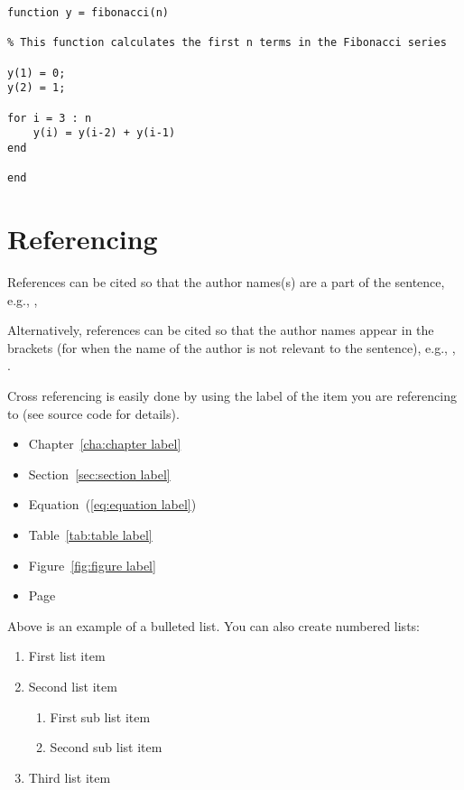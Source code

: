 \begin{lstlisting}[style=matlabcode,
    caption = A MATLAB function to compute the first $n$ numbers of the Fibonacci series,
    label = mat:fibonacci
    ]
function y = fibonacci(n)

% This function calculates the first n terms in the Fibonacci series

y(1) = 0;
y(2) = 1;

for i = 3 : n
    y(i) = y(i-2) + y(i-1)
end

end
\end{lstlisting}

\section{Referencing}
References can be cited so that the author names(s) are a part of the sentence, e.g., \textcite{stroud:2013}, \textcite{harten:1983}

Alternatively, references can be cited so that the author names appear in the brackets (for when the name of the author is not relevant to the sentence), e.g., \parencite{stroud:2013},  \parencite{harten:1983}.

Cross referencing is easily done by using the label of the item you are referencing to (see source code for details).
\begin{itemize}
	\item Chapter~\ref{cha:chapter label}
	\item Section~\ref{sec:section label}
	\item Equation~(\ref{eq:equation label})
	\item Table~\ref{tab:table label}
	\item Figure~\ref{fig:figure label}
	\item Page~\pageref{eq:equation label}
\end{itemize}

Above is an example of a bulleted list. You can also create numbered lists:
\begin{enumerate}
	\item First list item
	\item Second list item
	\begin{enumerate}
		\item First sub list item
		\item Second sub list item
	\end{enumerate}
	\item Third list item
\end{enumerate}
